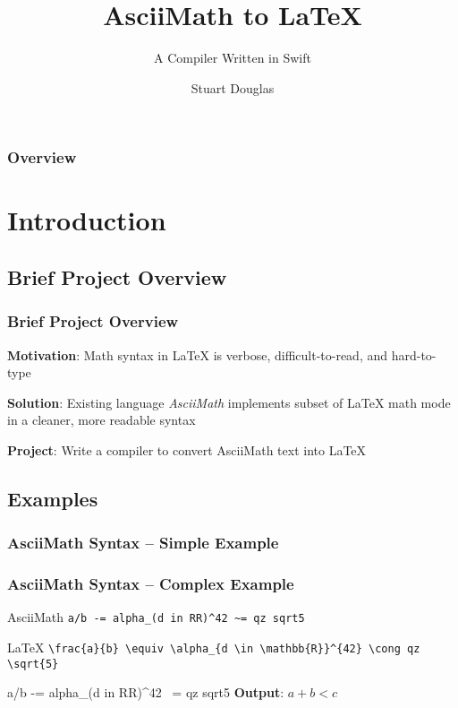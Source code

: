 \documentclass{beamer}
\title[AsciiMath to LaTeX]{AsciiMath to LaTeX}
\subtitle{A Compiler Written in Swift}
\institute{McMaster University}
\author{Stuart Douglas}
\begin{document}
\frame{\titlepage}

\begin{frame}
\frametitle{Overview}
\tableofcontents
\end{frame}

\section{Introduction} 
\subsection{Brief Project Overview}
\begin{frame}
\frametitle{Brief Project Overview}
\textbf{Motivation}: Math syntax in \LaTeX{} is verbose, difficult-to-read, and hard-to-type\\\vspace{3mm}

\textbf{Solution}: Existing language \emph{AsciiMath} implements subset of \LaTeX{}  math mode in a cleaner, more readable syntax\\\vspace{3mm}

\textbf{Project}: Write a compiler to convert AsciiMath text into \LaTeX{}
\end{frame}

\subsection{Examples}
\begin{frame}
\frametitle{AsciiMath Syntax -- Simple Example}
\end{frame}

\begin{frame}
\frametitle{AsciiMath Syntax -- Complex Example}
\begin{block}{AsciiMath}
\texttt{a/b -= alpha\_(d in RR)\^{}42 \~{}= qz sqrt5}
\end{block}

\begin{block}{\LaTeX{}}
\texttt{\textbackslash frac\{a\}\{b\} \textbackslash{}equiv \textbackslash{}alpha\_\{d \textbackslash{}in \textbackslash{}mathbb\{R\}\}\^{}\{42\} \textbackslash{}cong qz \textbackslash{}sqrt\{5\}}
\end{block}
a/b -= alpha_(d in RR)^42 ~= qz sqrt5
\vspace{4mm}
\textbf{Output}: $a + b < c$

\end{frame}
\end{document}
